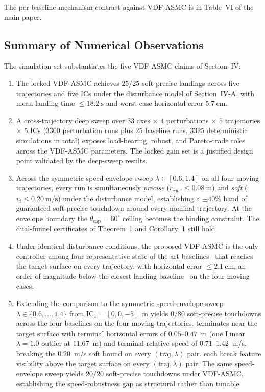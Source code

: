 \documentclass[10pt,journal]{IEEEtran}
\begin{document}
The per-baseline mechanism contrast against VDF-ASMC is in Table~VI of the main paper.

\subsection{Summary of Numerical Observations}
\label{sec:sup-summary}
The simulation set substantiates the five VDF-ASMC claims of Section~IV:
\begin{enumerate}
    \item The locked VDF-ASMC achieves $25/25$ soft-precise landings across five trajectories and five ICs under the disturbance model of Section~IV-A, with mean landing time $\le 18.2~\text{s}$ and worst-case horizontal error $5.7~\text{cm}$.
    \item A cross-trajectory deep sweep over $33$ axes $\times$ $4$ perturbations $\times$ $5$ trajectories $\times$ $5$ ICs ($3300$ perturbation runs plus $25$ baseline runs, $3325$ deterministic simulations in total) exposes load-bearing, robust, and Pareto-trade roles across the VDF-ASMC parameters. The locked gain set is a justified design point validated by the deep-sweep results.
    \item Across the symmetric speed-envelope sweep $\lambda\in[0.6,1.4]$ on all four moving trajectories, every run is simultaneously \emph{precise} ($r_{xy,\text{f}}\le 0.08~\text{m}$) and \emph{soft} ($v_\text{f}\le 0.20~\text{m/s}$) under the disturbance model, establishing a $\pm 40\%$ band of guaranteed soft-precise touchdown around every nominal trajectory. At the envelope boundary the $\theta_\text{cap}=60^\circ$ ceiling becomes the binding constraint. The dual-funnel certificates of Theorem~1 and Corollary~1 still hold.
    \item Under identical disturbance conditions, the proposed VDF-ASMC is the only controller among four representative state-of-the-art baselines~\cite{lin2022,zhang2026,chen2025,cho2022} that reaches the target surface on every trajectory, with horizontal error $\le 2.1~\text{cm}$, an order of magnitude below the closest landing baseline~\cite{zhang2026} on the four moving cases.
    \item Extending the comparison to the symmetric speed-envelope sweep $\lambda\in\{0.6,\ldots,1.4\}$ from IC$_1=[0,0,-5]$~m yields $0/80$ soft-precise touchdowns across the four baselines on the four moving trajectories. \cite{zhang2026} terminates near the target surface with terminal horizontal errors of $0.05$--$0.47$~m (one Linear $\lambda{=}1.0$ outlier at $11.67$~m) and terminal relative speed of $0.71$--$1.42$~m/s, breaking the $0.20$~m/s soft bound on every $(\text{traj},\lambda)$ pair. \cite{lin2022,chen2025,cho2022} each break feature visibility above the target surface on every $(\text{traj},\lambda)$ pair. The same speed-envelope sweep yields $20/20$ soft-precise touchdowns under VDF-ASMC, establishing the speed-robustness gap as structural rather than tunable.
\end{enumerate}


\end{document}
